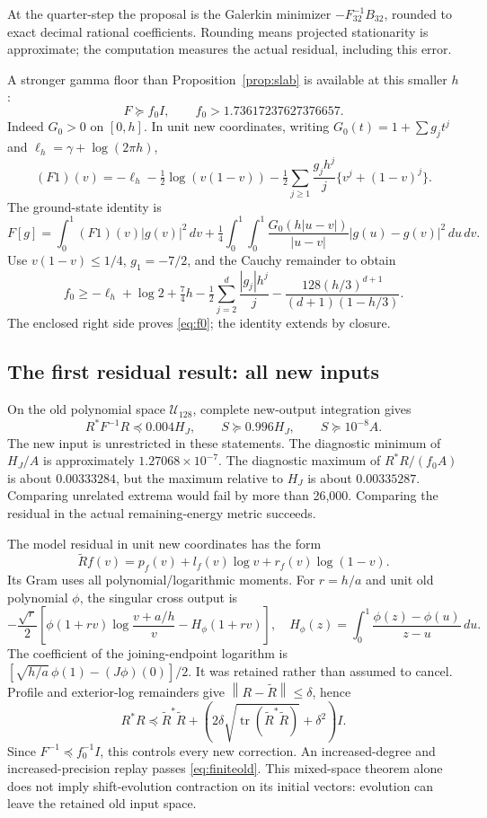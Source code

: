 \documentclass[11pt]{article}
\theoremstyle{remark}\newtheorem{remark}[theorem]{Remark}
\newcommand{\norm}[1]{\left\|#1\right\|}
\begin{document}
At the quarter-step the proposal is the Galerkin minimizer $-F_{32}^{-1}B_{32}$, rounded to exact decimal rational coefficients. Rounding means projected stationarity is approximate; the computation measures the actual residual, including this error.

A stronger gamma floor than Proposition~\ref{prop:slab} is available at this smaller $h$:
\begin{equation}\label{eq:f0}
 F\succeq f_0I,\qquad f_0>1.73617237627376657.
\end{equation}
Indeed $G_0>0$ on $[0,h]$. In unit new coordinates, writing $G_0(t)=1+\sum g_jt^j$ and $\ell_h=\gamma+\log(2\pi h)$,
\[
 (F1)(v)=-\ell_h-\tfrac12\log(v(1-v))
 -\tfrac12\sum_{j\ge1}\frac{g_jh^j}{j}\{v^j+(1-v)^j\}.
\]
The ground-state identity is
\[
 F[g]=\int_0^1(F1)(v)|g(v)|^2\,dv+\tfrac14\int_0^1\!\int_0^1
 \frac{G_0(h|u-v|)}{|u-v|}|g(u)-g(v)|^2\,du\,dv.
\]
Use $v(1-v)\le1/4$, $g_1=-7/2$, and the Cauchy remainder to obtain
\[
 f_0\ge-\ell_h+\log2+\tfrac74h
 -\tfrac12\sum_{j=2}^{d}\frac{|g_j|h^j}{j}
 -\frac{128(h/3)^{d+1}}{(d+1)(1-h/3)}.
\]
The enclosed right side proves \eqref{eq:f0}; the identity extends by closure.

\subsection{The first residual result: all new inputs}
On the old polynomial space $\mathcal U_{128}$, complete new-output integration gives
\begin{equation}\label{eq:finiteold}
 R^*F^{-1}R\preceq0.004H_J,\qquad S\succeq0.996H_J,\qquad S\succeq10^{-8}A.
\end{equation}
The new input is unrestricted in these statements. The diagnostic minimum of $H_J/A$ is approximately $1.27068\times10^{-7}$. The diagnostic maximum of $R^*R/(f_0A)$ is about $0.00333284$, but the maximum relative to $H_J$ is about $0.00335287$. Comparing unrelated extrema would fail by more than 26,000. Comparing the residual in the actual remaining-energy metric succeeds.

The model residual in unit new coordinates has the form
\[
 \widetilde Rf(v)=p_f(v)+l_f(v)\log v+r_f(v)\log(1-v).
\]
Its Gram uses all polynomial/logarithmic moments. For $r=h/a$ and unit old polynomial $\phi$, the singular cross output is
\[
 -\frac{\sqrt r}{2}\left[\phi(1+rv)\log\frac{v+a/h}{v}-H_\phi(1+rv)\right],\quad
 H_\phi(z)=\int_0^1\frac{\phi(z)-\phi(u)}{z-u}\,du.
\]
The coefficient of the joining-endpoint logarithm is
$[\sqrt{h/a}\,\phi(1)-(J\phi)(0)]/2$. It was retained rather than assumed to cancel. Profile and exterior-log remainders give $\norm{R-\widetilde R}\le\delta$, hence
\[
 R^*R\preceq\widetilde R^*\widetilde R+\left(2\delta\sqrt{\operatorname{tr}(\widetilde R^*\widetilde R)}+\delta^2\right)I.
\]
Since $F^{-1}\preceq f_0^{-1}I$, this controls every new correction. An increased-degree and increased-precision replay passes \eqref{eq:finiteold}. This mixed-space theorem alone does not imply shift-evolution contraction on its initial vectors: evolution can leave the retained old input space.
\end{document}
